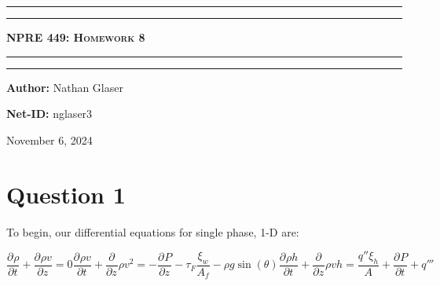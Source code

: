 \documentclass{article}
\begin{document}
\newcommand{\circled}[1]{\tikz[baseline=(char.base)]{
            \node[shape=circle,draw,inner sep=2pt] (char) {#1};}}

\newcommand{\pd}[3]{\frac{\partial^{#3}#1}{\partial {#2}^{#3}}}
\begin{titlepage}

\centering
\scshape
\vspace{\baselineskip}

%
\rule{\textwidth}{1.6pt}\vspace*{-\baselineskip}\vspace*{2pt}
\rule{\textwidth}{0.4pt}

{\Huge \textbf{\textsc{NPRE 449: Homework 8 \\
\vspace{15pt}}}}

\rule{\textwidth}{0.4pt}\vspace*{-\baselineskip}\vspace{3.2pt}
\rule{\textwidth}{1.6pt}\vspace{6pt}
\vspace{1.5\baselineskip}


\large \centerline{\textbf{Author:} Nathan Glaser}
\large \centerline{\textbf{Net-ID:} nglaser3}
\quad

\vfill
\large \centerline{November 6, 2024}
%
\end{titlepage}

\tableofcontents
\newpage
{}

\section{Question 1}
To begin, our differential equations for single phase, 1-D are:

\begin{subequations}
    \begin{equation}
        \pd{\rho}{t}{} + \pd{\rho v}{z}{} = 0
        \label{mass}
    \end{equation}
    \begin{equation}
        \pd{\rho v}{t}{} + \pd{}{z}{}\rho v^2 = -\pd{P}{z}{}-\tau_F\frac{\xi_w}{A_f} - \rho g \sin(\theta)
        \label{momentum}
    \end{equation}
    \begin{equation}
        \pd{\rho h}{t}{} + \pd{}{z}{}\rho v h = \frac{q''\xi_h}{A}+\pd{P}{t}{} + q'''
        \label{energy}
    \end{equation}
\end{subequations}
\end{document}
